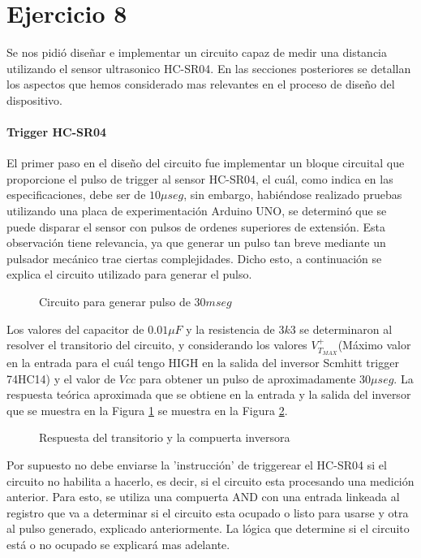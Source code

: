 \part*{Ejercicio 8}

Se nos pidió diseñar e implementar un circuito capaz de medir una distancia utilizando el sensor ultrasonico HC-SR04. En las secciones posteriores se detallan los aspectos que hemos considerado mas relevantes en el proceso de diseño del dispositivo.

\subsection*{Trigger HC-SR04}

El primer paso en el diseño del circuito fue implementar un bloque circuital que proporcione el pulso de trigger al sensor HC-SR04, el cuál, como indica en las especificaciones, debe ser de $10 \mu seg$, sin embargo, habiéndose realizado pruebas utilizando una placa de experimentación Arduino UNO, se determinó que se puede disparar el sensor con pulsos de ordenes superiores de extensión. Esta observación tiene relevancia, ya que generar un pulso tan breve mediante un pulsador mecánico trae ciertas complejidades. Dicho esto, a continuación se explica el circuito utilizado para generar el pulso.
\bigskip

\begin{figure}[H]
\begin{center}

\end{center}
\caption{Circuito para generar pulso de $30 mseg$} \label{8_fig1}
\end{figure}

Los valores del capacitor de $0.01\mu F$ y la resistencia de $3k3$ se determinaron al resolver el transitorio del circuito, y considerando los valores $V_{T_{MAX}}^+$(Máximo valor en la entrada para el cuál tengo HIGH en la salida del inversor Scmhitt trigger 74HC14) y el valor de $Vcc$ para obtener un pulso de aproximadamente $30 \mu seg$. La respuesta teórica aproximada que se obtiene en la entrada y la salida del inversor que se muestra en la Figura \ref{8_fig1} se muestra en la Figura \ref{8_fig2}.

\begin{figure}[H]
\centering

\caption{Respuesta del transitorio y la compuerta inversora} 
\label{8_fig2}
\end{figure}

Por supuesto no debe enviarse la 'instrucción' de triggerear el HC-SR04 si el circuito no habilita a hacerlo, es decir, si el circuito esta procesando una medición anterior. Para esto, se utiliza una compuerta AND con una entrada linkeada al registro que va a determinar si el circuito esta ocupado o listo para usarse y otra al pulso generado, explicado anteriormente. La lógica que determine si el circuito está o no ocupado se explicará mas adelante.


